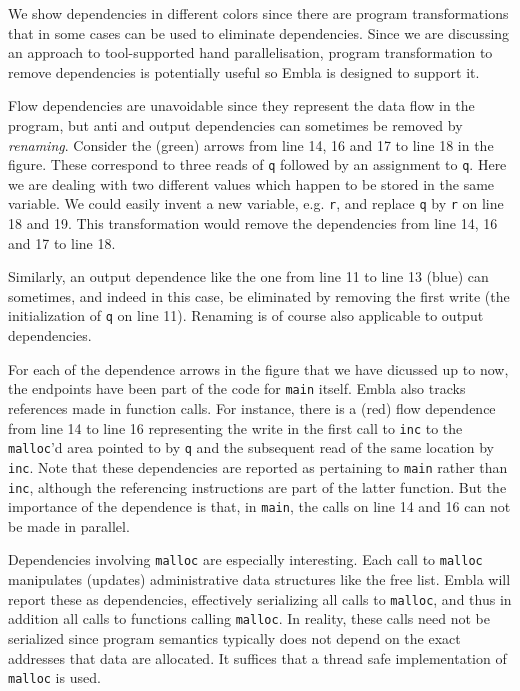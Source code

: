 We show dependencies in different colors since there are program
transformations that in some cases can be used to eliminate 
dependencies. Since we are discussing an approach to tool-supported
hand parallelisation, program transformation to remove dependencies
is potentially useful so Embla is designed to support it.

Flow dependencies are unavoidable since they represent the data flow 
in the program, but anti and output dependencies can sometimes be 
removed by {\em renaming}. Consider the (green) arrows from line 
14, 16 and 17 to line 18 in the figure. These correspond to three
reads of {\tt q} followed by an assignment to {\tt q}. Here we 
are dealing with two different values which happen to be stored 
in the same variable. We could easily invent a new variable, e.g. 
{\tt r}, and replace {\tt q} by {\tt r} on line 18 and 19. This 
transformation would remove the dependencies from line 14, 16 and
17 to line 18. 

Similarly, an output dependence like the one from line 11 to line 13
(blue) can sometimes, and indeed in this case, be eliminated by 
removing the first write (the initialization of {\tt q} on line 11).
Renaming is of course also applicable to output dependencies.

For each of the dependence arrows in the figure that 
we have dicussed up to now, the endpoints have been part of the 
code for {\tt main}
itself. Embla also tracks references made in function calls. For
instance, there is a (red) flow dependence from line 14 to line 16
representing the write in the first call to {\tt inc} to the 
{\tt malloc}'d area pointed to by {\tt q} and the subsequent read 
of the same location by {\tt inc}. Note that these dependencies 
are reported as pertaining to {\tt main} rather than {\tt inc},
although the referencing instructions are part of the latter function. 
But the importance of the dependence is that, in {\tt main}, the calls
on line 14 and 16 can not be made in parallel.

Dependencies involving {\tt malloc} are especially interesting.
Each call to {\tt malloc} manipulates (updates) 
administrative data structures like the free list. Embla will
report these as dependencies, effectively serializing all calls to 
{\tt malloc}, and thus in addition all calls to functions calling
{\tt malloc}. In reality, these calls need not be serialized since
program semantics typically does not depend on the exact addresses 
that data are allocated. It suffices that a thread safe 
implementation of {\tt malloc} is used.

